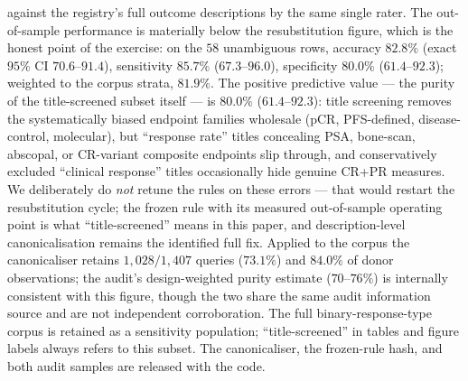 \documentclass[11pt]{article}
\begin{document}
against the registry's full outcome descriptions by the same single rater.
The out-of-sample performance is materially below the resubstitution
figure, which is the honest point of the exercise: on the $58$ unambiguous
rows, accuracy $82.8\%$ (exact $95\%$ CI $70.6$--$91.4$), sensitivity
$85.7\%$ ($67.3$--$96.0$), specificity $80.0\%$ ($61.4$--$92.3$); weighted
to the corpus strata, $81.9\%$. The positive predictive value --- the
purity of the title-screened subset itself --- is $80.0\%$
($61.4$--$92.3$): title screening removes the systematically biased
endpoint families wholesale (pCR, PFS-defined, disease-control,
molecular), but ``response rate'' titles concealing PSA, bone-scan,
abscopal, or CR-variant composite endpoints slip through, and
conservatively excluded ``clinical response'' titles occasionally hide
genuine CR+PR measures. We deliberately do \emph{not} retune the rules on
these errors --- that would restart the resubstitution cycle; the frozen
rule with its measured out-of-sample operating point is what
``title-screened'' means in this paper, and description-level
canonicalisation remains the identified full fix.
Applied to the corpus the canonicaliser retains $1{,}028/1{,}407$ queries
($73.1\%$) and $84.0\%$ of donor observations; the audit's design-weighted
purity estimate ($70$--$76\%$) is internally consistent with this figure,
though the two share the same audit information source and are not
independent corroboration. The full binary-response-type corpus is retained
as a sensitivity population; ``title-screened'' in tables and figure labels
always refers to this subset. The canonicaliser, the frozen-rule hash, and
both audit samples are released with the code.
\end{document}
